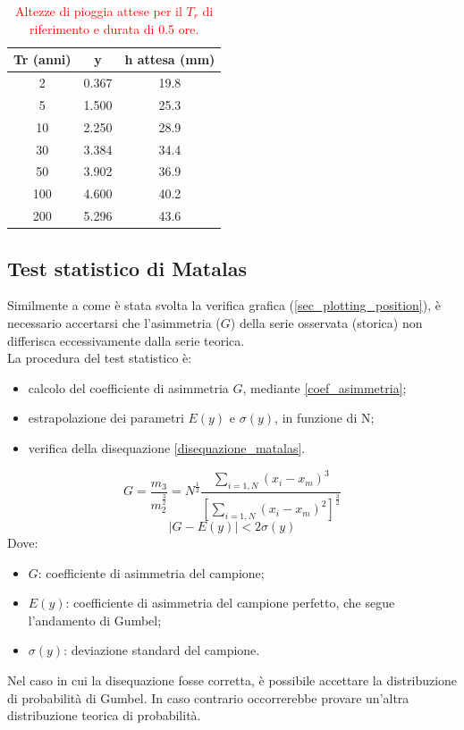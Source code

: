 \begin{table}[H] \centering
    \caption{\textcolor{red}{Altezze di pioggia attese per il $T_r$ di riferimento e durata di 0.5 ore.}}
        \begin{tabular}{ccc}
        \toprule
        Tr (anni) & y     & h attesa (mm) \\
        \midrule
        2 & 0.367 & 19.8  \\
        5 & 1.500 & 25.3  \\
        10  & 2.250 & 28.9          \\
        30  & 3.384 & 34.4          \\
        50  & 3.902 & 36.9          \\
        100 & 4.600 & 40.2          \\
        200 & 5.296 & 43.6          \\         
        \bottomrule
        \end{tabular}
\end{table}
    
\subsection{Test statistico di Matalas}
Similmente a come è stata svolta la verifica grafica (\ref{sec_plotting_position}), è necessario accertarsi che l'asimmetria ($G$) della serie osservata (storica) non differisca eccessivamente dalla serie teorica.\\
La procedura del test statistico è:
\begin{itemize}
\item calcolo del coefficiente di asimmetria $G$, mediante \ref{coef_asimmetria};
\item estrapolazione dei parametri $E(y)$ e $\sigma(y)$, in funzione di N;
\item verifica della disequazione \ref{disequazione_matalas}.
\end{itemize}
\begin{equation}
    G = \frac{m_3}{m_2^{\frac{3}{2}}} = N^{\frac{1}{2}} \frac{\sum_{i=1,N}(x_i - x_m)^3}{\left[\sum_{i=1,N}(x_i-x_m)^2\right]^{\frac{3}{2}}}
    \label{coef_asimmetria}
\end{equation}
\begin{equation}
    |G - E (y)| < 2 \sigma(y)
    \label{disequazione_matalas}
\end{equation}
Dove:
\begin{itemize}
    \item $G$: coefficiente di asimmetria del campione;
    \item $E(y)$: coefficiente di asimmetria del campione perfetto, che segue l'andamento di Gumbel;
    \item $\sigma (y)$: deviazione standard del campione.
\end{itemize}
Nel caso in cui la disequazione fosse corretta, è possibile accettare la distribuzione di probabilità di Gumbel. In caso contrario occorrerebbe provare un'altra distribuzione teorica di probabilità.

